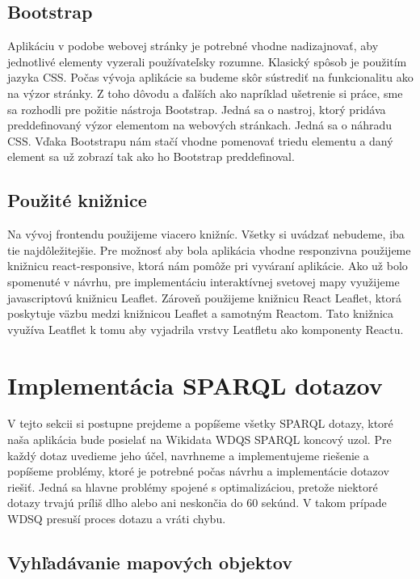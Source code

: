 \subsection*{Bootstrap}
Aplikáciu v podobe webovej stránky je potrebné vhodne nadizajnovať, aby jednotlivé elementy vyzerali používateľsky rozumne.  Klasický spôsob je použitím jazyka CSS. Počas vývoja aplikácie sa budeme skôr sústrediť na funkcionalitu ako na výzor stránky. Z toho 
dôvodu a ďalších ako napríklad ušetrenie si práce, sme sa rozhodli pre požitie nástroja Bootstrap. Jedná sa o nastroj, ktorý pridáva preddefinovaný výzor elementom na webových stránkach. 
Jedná sa o náhradu CSS. Vďaka Bootstrapu nám stačí vhodne pomenovať triedu elementu a daný element sa už zobrazí tak ako ho Bootstrap preddefinoval. 

\subsection*{Použité knižnice}

Na vývoj frontendu použijeme viacero knižníc. Všetky si uvádzať nebudeme, iba tie najdôležitejšie. Pre možnosť aby bola aplikácia vhodne responzivna použijeme knižnicu react-responsive, ktorá nám pomôže 
pri vyváraní aplikácie. Ako už bolo spomenuté v návrhu, pre implementáciu interaktívnej svetovej mapy využijeme javascriptovú knižnicu Leaflet. 
Zároveň použijeme knižnicu React Leaflet, ktorá poskytuje väzbu medzi knižnicou Leaflet a samotným Reactom. Tato knižnica využíva Leatflet k tomu aby vyjadrila vrstvy Leatfletu ako komponenty Reactu. 



\section{Implementácia SPARQL dotazov}
V tejto sekcii si postupne prejdeme a popíšeme všetky SPARQL dotazy, ktoré naša aplikácia
bude posielať na Wikidata WDQS SPARQL koncový uzol. Pre každý dotaz uvedieme jeho účel, navrhneme a implementujeme
riešenie a popíšeme problémy, ktoré je potrebné počas návrhu a implementácie dotazov riešiť. Jedná sa hlavne
problémy spojené s optimalizáciou, pretože niektoré dotazy trvajú príliš dlho alebo ani neskončia do 60 sekúnd.
V takom prípade  WDSQ presuší proces dotazu a vráti chybu.

\subsection{Vyhľadávanie mapových objektov}

